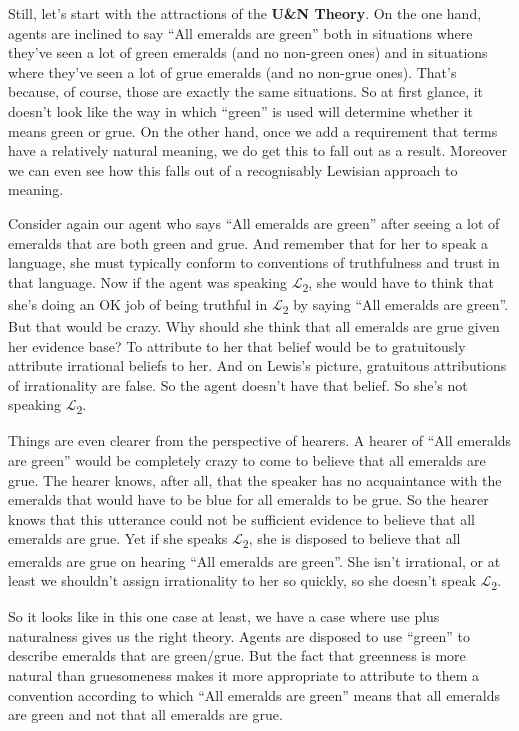 \documentclass[
  11pt,
  letterpaper,
  DIV=11,
  numbers=noendperiod,
  twoside]{scrartcl}
\begin{document}
Still, let's start with the attractions of the \textbf{U\&N Theory}. On
the one hand, agents are inclined to say ``All emeralds are green'' both
in situations where they've seen a lot of green emeralds (and no
non-green ones) and in situations where they've seen a lot of grue
emeralds (and no non-grue ones). That's because, of course, those are
exactly the same situations. So at first glance, it doesn't look like
the way in which ``green'' is used will determine whether it means green
or grue. On the other hand, once we add a requirement that terms have a
relatively natural meaning, we do get this to fall out as a result.
Moreover we can even see how this falls out of a recognisably Lewisian
approach to meaning.

Consider again our agent who says ``All emeralds are green'' after
seeing a lot of emeralds that are both green and grue. And remember that
for her to speak a language, she must typically conform to conventions
of truthfulness and trust in that language. Now if the agent was
speaking \(\mathcal{L}\)\textsubscript{2}, she would have to think that
she's doing an OK job of being truthful in
\(\mathcal{L}\)\textsubscript{2} by saying ``All emeralds are green''.
But that would be crazy. Why should she think that all emeralds are grue
given her evidence base? To attribute to her that belief would be to
gratuitously attribute irrational beliefs to her. And on Lewis's
picture, gratuitous attributions of irrationality are false. So the
agent doesn't have that belief. So she's not speaking
\(\mathcal{L}\)\textsubscript{2}.

Things are even clearer from the perspective of hearers. A hearer of
``All emeralds are green'' would be completely crazy to come to believe
that all emeralds are grue. The hearer knows, after all, that the
speaker has no acquaintance with the emeralds that would have to be blue
for all emeralds to be grue. So the hearer knows that this utterance
could not be sufficient evidence to believe that all emeralds are grue.
Yet if she speaks \(\mathcal{L}\)\textsubscript{2}, she is disposed to
believe that all emeralds are grue on hearing ``All emeralds are
green''. She isn't irrational, or at least we shouldn't assign
irrationality to her so quickly, so she doesn't speak
\(\mathcal{L}\)\textsubscript{2}.

So it looks like in this one case at least, we have a case where use
plus naturalness gives us the right theory. Agents are disposed to use
``green'' to describe emeralds that are green/grue. But the fact that
greenness is more natural than gruesomeness makes it more appropriate to
attribute to them a convention according to which ``All emeralds are
green'' means that all emeralds are green and not that all emeralds are
grue.
\end{document}
